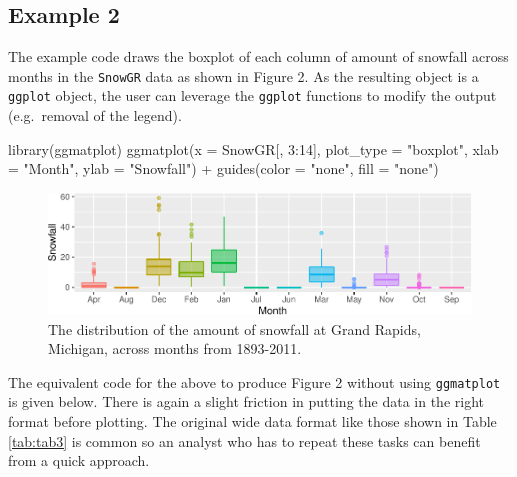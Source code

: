 \documentclass[10pt,a4paper,onecolumn]{article}
\newenvironment{Shaded}{\begin{snugshade}}{\end{snugshade}}
\newcommand{\AttributeTok}[1]{\textcolor[rgb]{0.77,0.63,0.00}{#1}}
\newcommand{\DecValTok}[1]{\textcolor[rgb]{0.00,0.00,0.81}{#1}}
\newcommand{\FunctionTok}[1]{\textcolor[rgb]{0.00,0.00,0.00}{#1}}
\newcommand{\NormalTok}[1]{#1}
\newcommand{\SpecialCharTok}[1]{\textcolor[rgb]{0.00,0.00,0.00}{#1}}
\newcommand{\StringTok}[1]{\textcolor[rgb]{0.31,0.60,0.02}{#1}}
\begin{document}
\hypertarget{example-2}{%
\subsection{Example 2}\label{example-2}}

The example code draws the boxplot of each column of amount of snowfall
across months in the \texttt{SnowGR} data as shown in Figure 2. As the
resulting object is a \texttt{ggplot} object, the user can leverage the
\texttt{ggplot} functions to modify the output (e.g.~removal of the
legend).

\begin{Shaded}
\begin{Highlighting}[]
\FunctionTok{library}\NormalTok{(ggmatplot)}
\FunctionTok{ggmatplot}\NormalTok{(}\AttributeTok{x =}\NormalTok{ SnowGR[, }\DecValTok{3}\SpecialCharTok{:}\DecValTok{14}\NormalTok{], }\AttributeTok{plot\_type =} \StringTok{"boxplot"}\NormalTok{,}
          \AttributeTok{xlab =} \StringTok{"Month"}\NormalTok{,  }\AttributeTok{ylab =} \StringTok{"Snowfall"}\NormalTok{) }\SpecialCharTok{+}
  \FunctionTok{guides}\NormalTok{(}\AttributeTok{color =} \StringTok{"none"}\NormalTok{, }\AttributeTok{fill =} \StringTok{"none"}\NormalTok{)}
\end{Highlighting}
\end{Shaded}

\begin{figure}
\centering
\includegraphics{paper_files/figure-latex/matplot3-1.pdf}
\caption{The distribution of the amount of snowfall at Grand Rapids,
Michigan, across months from 1893-2011.}
\end{figure}

The equivalent code for the above to produce Figure 2 without using
\texttt{ggmatplot} is given below. There is again a slight friction in
putting the data in the right format before plotting. The original wide
data format like those shown in Table \ref{tab:tab3} is common so an
analyst who has to repeat these tasks can benefit from a quick approach.
\end{document}

